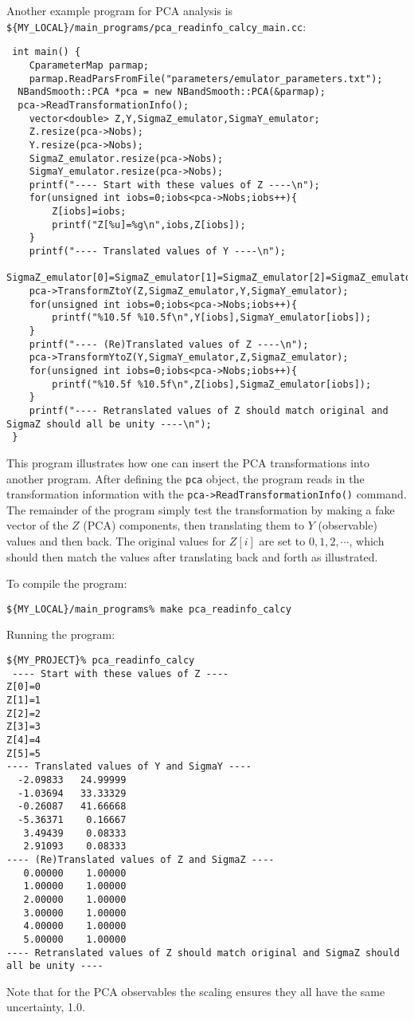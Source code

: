 \documentclass[UserManual.tex]{subfiles}
\begin{document}
Another example program for PCA analysis is {\tt \$\{MY\_LOCAL\}/main\_programs/pca\_readinfo\_calcy\_main.cc}:
{\tt\begin{verbatim}
 int main() {
	CparameterMap parmap;
	parmap.ReadParsFromFile("parameters/emulator_parameters.txt");
  NBandSmooth::PCA *pca = new NBandSmooth::PCA(&parmap);
  pca->ReadTransformationInfo();
	vector<double> Z,Y,SigmaZ_emulator,SigmaY_emulator;
	Z.resize(pca->Nobs);
	Y.resize(pca->Nobs);
	SigmaZ_emulator.resize(pca->Nobs);
	SigmaY_emulator.resize(pca->Nobs);
	printf("---- Start with these values of Z ----\n");
	for(unsigned int iobs=0;iobs<pca->Nobs;iobs++){
		Z[iobs]=iobs;
		printf("Z[%u]=%g\n",iobs,Z[iobs]);
	}
	printf("---- Translated values of Y ----\n");
	SigmaZ_emulator[0]=SigmaZ_emulator[1]=SigmaZ_emulator[2]=SigmaZ_emulator[3]=SigmaZ_emulator[4]=SigmaZ_emulator[5]=1.0;	
	pca->TransformZtoY(Z,SigmaZ_emulator,Y,SigmaY_emulator);
	for(unsigned int iobs=0;iobs<pca->Nobs;iobs++){
		printf("%10.5f %10.5f\n",Y[iobs],SigmaY_emulator[iobs]);
	}
	printf("---- (Re)Translated values of Z ----\n");
	pca->TransformYtoZ(Y,SigmaY_emulator,Z,SigmaZ_emulator);
	for(unsigned int iobs=0;iobs<pca->Nobs;iobs++){
		printf("%10.5f %10.5f\n",Z[iobs],SigmaZ_emulator[iobs]);
	}
	printf("---- Retranslated values of Z should match original and SigmaZ should all be unity ----\n");
 }
\end{verbatim}}
This program illustrates how one can insert the PCA transformations into another program. After defining the {\tt pca} object, the program reads in the transformation information with the {\tt pca->ReadTransformationInfo()} command. The remainder of the program simply test the transformation by  making a fake vector of the $Z$ (PCA) components, then translating them to $Y$ (observable) values and then back. The original values for $Z[i]$ are set to $0,1,2,\cdots$, which should then match the values after translating back and forth as illustrated. 

To compile the program:
{\tt\begin{verbatim}
${MY_LOCAL}/main_programs% make pca_readinfo_calcy
\end{verbatim}}
Running the program:
{\tt\begin{verbatim}
${MY_PROJECT}% pca_readinfo_calcy
 ---- Start with these values of Z ----
Z[0]=0
Z[1]=1
Z[2]=2
Z[3]=3
Z[4]=4
Z[5]=5
---- Translated values of Y and SigmaY ----
  -2.09833   24.99999
  -1.03694   33.33329
  -0.26087   41.66668
  -5.36371    0.16667
   3.49439    0.08333
   2.91093    0.08333
---- (Re)Translated values of Z and SigmaZ ----
   0.00000    1.00000
   1.00000    1.00000
   2.00000    1.00000
   3.00000    1.00000
   4.00000    1.00000
   5.00000    1.00000
---- Retranslated values of Z should match original and SigmaZ should all be unity ----
\end{verbatim}}
Note that for the PCA observables the scaling ensures they all have the same uncertainty, 1.0. 
\end{document}
